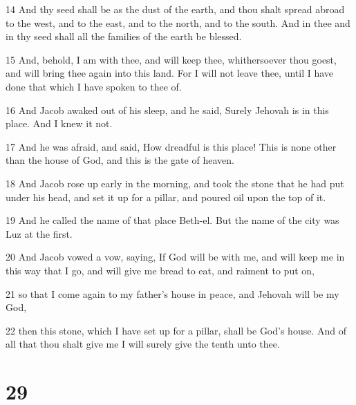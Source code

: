 \par 14 And thy seed shall be as the dust of the earth, and thou shalt spread abroad to the west, and to the east, and to the north, and to the south. And in thee and in thy seed shall all the families of the earth be blessed.
\par 15 And, behold, I am with thee, and will keep thee, whithersoever thou goest, and will bring thee again into this land. For I will not leave thee, until I have done that which I have spoken to thee of.
\par 16 And Jacob awaked out of his sleep, and he said, Surely Jehovah is in this place. And I knew it not.
\par 17 And he was afraid, and said, How dreadful is this place! This is none other than the house of God, and this is the gate of heaven.
\par 18 And Jacob rose up early in the morning, and took the stone that he had put under his head, and set it up for a pillar, and poured oil upon the top of it.
\par 19 And he called the name of that place Beth-el. But the name of the city was Luz at the first.
\par 20 And Jacob vowed a vow, saying, If God will be with me, and will keep me in this way that I go, and will give me bread to eat, and raiment to put on,
\par 21 so that I come again to my father's house in peace, and Jehovah will be my God,
\par 22 then this stone, which I have set up for a pillar, shall be God's house. And of all that thou shalt give me I will surely give the tenth unto thee.

\chapter{29}

